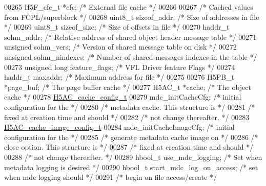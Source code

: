 \begin{DoxyCode}
00265     H5F\_efc\_t   *efc;           \textcolor{comment}{/* External file cache                  */}
00266 
00267     \textcolor{comment}{/* Cached values from FCPL/superblock */}
00268     uint8\_t sizeof\_addr;    \textcolor{comment}{/* Size of addresses in file            */}
00269     uint8\_t sizeof\_size;    \textcolor{comment}{/* Size of offsets in file              */}
00270     haddr\_t sohm\_addr;  \textcolor{comment}{/* Relative address of shared object header message table */}
00271     \textcolor{keywordtype}{unsigned}    sohm\_vers;  \textcolor{comment}{/* Version of shared message table on disk */}
00272     \textcolor{keywordtype}{unsigned}    sohm\_nindexes;  \textcolor{comment}{/* Number of shared messages indexes in the table */}
00273     \textcolor{keywordtype}{unsigned} \textcolor{keywordtype}{long} feature\_flags; \textcolor{comment}{/* VFL Driver feature Flags            */}
00274     haddr\_t maxaddr;    \textcolor{comment}{/* Maximum address for file             */}
00275 
00276     H5PB\_t      *page\_buf;                  \textcolor{comment}{/* The page buffer cache                */}
00277     H5AC\_t      *cache;     \textcolor{comment}{/* The object cache         */}
00278     \hyperlink{struct_h5_a_c__cache__config__t}{H5AC\_cache\_config\_t}
00279         mdc\_initCacheCfg; \textcolor{comment}{/* initial configuration for the      */}
00280                                 \textcolor{comment}{/* metadata cache.  This structure is   */}
00281                                 \textcolor{comment}{/* fixed at creation time and should    */}
00282                                 \textcolor{comment}{/* not change thereafter.               */}
00283     \hyperlink{struct_h5_a_c__cache__image__config__t}{H5AC\_cache\_image\_config\_t} 
00284         mdc\_initCacheImageCfg;  \textcolor{comment}{/* initial configuration for the */}
00285                                         \textcolor{comment}{/* generate metadata cache image on     */}
00286                                         \textcolor{comment}{/* close option.  This structure is     */}
00287                                         \textcolor{comment}{/* fixed at creation time and should    */}
00288                                         \textcolor{comment}{/* not change thereafter.               */}
00289     hbool\_t     use\_mdc\_logging; \textcolor{comment}{/* Set when metadata logging is desired */}
00290     hbool\_t     start\_mdc\_log\_on\_access; \textcolor{comment}{/* set when mdc logging should  */}
00291                                 \textcolor{comment}{/* begin on file access/create          */}

\end{DoxyCode}
